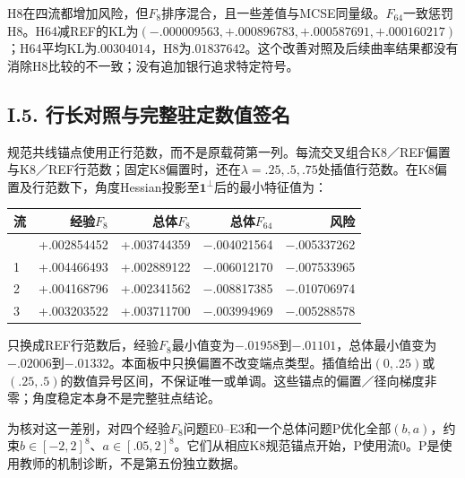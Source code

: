 \documentclass[11pt,a4paper]{article}
\begin{document}
H8在四流都增加风险，但\(F_8\)排序混合，且一些差值与MCSE同量级。\(F_{64}\)一致惩罚H8。H64减REF的KL为\((−.000009563,+.000896783,+.000587691,+.000160217)\)；H64平均KL为\(.00304014\)，H8为\(.01837642\)。这个改善对照及后续曲率结果都没有消除H8比较的不一致；没有追加银行追求特定符号。

\subsection*{I.5.
行长对照与完整驻定数值签名}\label{i.5.-ux884cux957fux5bf9ux7167ux4e0eux5b8cux6574ux9a7bux5b9aux6570ux503cux7b7eux540d}

规范共线锚点使用正行范数，而不是原载荷第一列。每流交叉组合K8／REF偏置与K8／REF行范数；固定K8偏置时，还在\(\lambda=.25,.5,.75\)处插值行范数。在K8偏置及行范数下，角度Hessian投影至\(\mathbf1^\perp\)后的最小特征值为：

\begin{longtable}[]{@{}lrrrr@{}}
\toprule\noalign{}
流 & 经验\(F_8\) & 总体\(F_8\) & 总体\(F_{64}\) & 风险 \\
\midrule\noalign{}
\endhead
\bottomrule\noalign{}
\endlastfoot
0 & +.002854452 & +.003744359 & −.004021564 & −.005337262 \\
1 & +.004466493 & +.002889122 & −.006012170 & −.007533965 \\
2 & +.004168796 & +.002341562 & −.008817385 & −.010706974 \\
3 & +.003203522 & +.003711700 & −.003994969 & −.005288578 \\
\end{longtable}

只换成REF行范数后，经验\(F_8\)最小值变为\(−.01958\)到\(−.01101\)，总体最小值变为\(−.02006\)到\(−.01332\)。本面板中只换偏置不改变端点类型。插值给出\((0,.25)\)或\((.25,.5)\)的数值异号区间，不保证唯一或单调。这些锚点的偏置／径向梯度非零；角度稳定本身不是完整驻点结论。

为核对这一差别，对四个经验\(F_8\)问题E0--E3和一个总体问题P优化全部\((b,a)\)，约束\(b\in[-2,2]^8\)、\(a\in[.05,2]^8\)。它们从相应K8规范锚点开始，P使用流0。P是使用教师的机制诊断，不是第五份独立数据。
\end{document}
